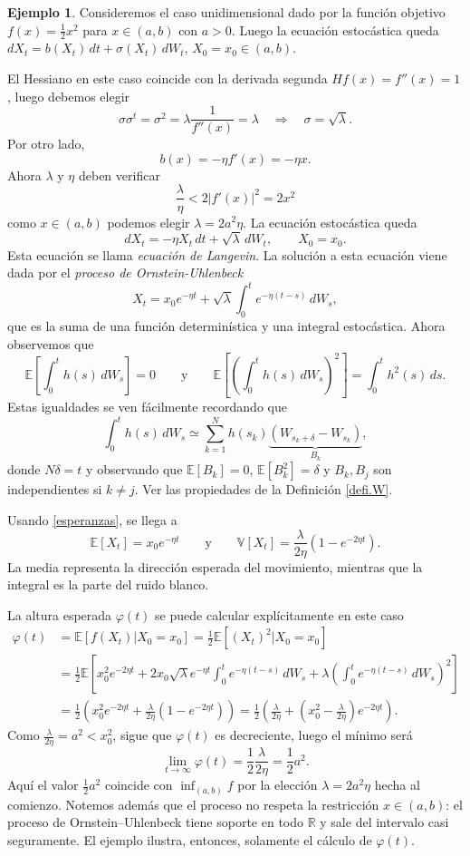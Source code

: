 \documentclass[12pt, a4paper]{amsbook}
\newcommand{\R}{{\mathbb R}}
\newcommand{\E}{{\mathbb E}}
\newcommand{\V}{{\mathbb V}}
\theoremstyle{remark}
\theoremstyle{definition}
\newtheorem{ejem}[teo]{Ejemplo}
\numberwithin{section}{chapter}
\numberwithin{subsection}{section}
\numberwithin{equation}{section}
\numberwithin{figure}{chapter}
\begin{document}
\begin{ejem}
Consideremos el caso unidimensional dado por la función objetivo $f(x)=\tfrac12 x^2$ para $x\in (a,b)$ con $a>0$. Luego la ecuación estocástica queda $dX_t = b(X_t)\, dt + \sigma(X_t)\, dW_t$, $X_0=x_0\in (a, b)$.

El Hessiano en este caso coincide con la derivada segunda $Hf(x) = f''(x) = 1$, luego debemos elegir 
$$
\sigma\sigma^t = \sigma^2 = \lambda \frac{1}{f''(x)} = \lambda\quad\Rightarrow\quad \sigma=\sqrt{\lambda}.
$$
Por otro lado,
$$
b(x) = -\eta f'(x) = -\eta x.
$$
Ahora $\lambda$ y $\eta$ deben verificar
$$
\frac{\lambda}{\eta} < 2|f'(x)|^2 = 2x^2
$$
como $x\in(a,b)$ podemos elegir $\lambda=2a^2\eta$. La ecuación estocástica queda
$$
dX_t = -\eta X_t\, dt + \sqrt{\lambda}\, dW_t,\qquad X_0=x_0.
$$
Esta ecuación se llama {\em ecuación de Langevin}. La solución a esta ecuación viene dada por el {\em proceso de Ornstein-Uhlenbeck}
$$
X_t = x_0 e^{-\eta t} + \sqrt{\lambda} \int_0^t e^{-\eta(t-s)}\, dW_s,
$$
que es la suma de una función determinística y una integral estocástica.
Ahora observemos que
\begin{equation}\label{esperanzas}
\E\left[\int_0^t h(s)\, dW_s\right] = 0\qquad \text{y}\qquad \E\left[\left(\int_0^t h(s)\, dW_s\right)^2\right] = \int_0^t h^2(s)\, ds.
\end{equation}
Estas igualdades se ven fácilmente recordando que
$$
\int_0^t h(s)\, dW_s \simeq \sum_{k=1}^N h(s_k) \underbrace{(W_{s_k+\delta} - W_{s_k})}_{B_k},
$$
donde $N\delta=t$ y observando que $\E[B_k]=0$, $\E[B_k^2]=\delta$ y $B_k, B_j$ son independientes si $k\neq j$. Ver las propiedades de la Definición \ref{defi.W}.

Usando \eqref{esperanzas}, se llega a
$$
\E[X_t] = x_0e^{-\eta t}\qquad \text{y} \qquad \V[X_t] = \frac{\lambda}{2\eta} (1-e^{-2\eta t}).
$$
La media representa la dirección esperada del movimiento, mientras que la integral es la parte del ruido blanco.

La altura esperada $\varphi(t)$ se puede calcular explícitamente en este caso
\begin{align*}
\varphi(t) & = \E[f(X_t)|X_0=x_0] = \frac12 \E[(X_t)^2|X_0=x_0]\\
&= \frac12 \E\left[ x_0^2 e^{-2\eta t} + 2x_0\sqrt{\lambda}e^{-\eta t}\int_0^t e^{-\eta(t-s)}\, dW_s + \lambda\left(\int_0^t e^{-\eta(t-s)}\, dW_s\right)^2\right]\\
&= \frac12 \left( x_0^2 e^{-2\eta t} +  \frac{\lambda}{2\eta} (1-e^{-2\eta t})\right) = \frac12 \left(\frac{\lambda}{2\eta} + \left(x_0^2 - \frac{\lambda}{2\eta}\right) e^{-2\eta t}\right).
\end{align*}
Como $\frac{\lambda}{2\eta}=a^2<x_0^2$, sigue que $\varphi(t)$ es decreciente, luego el mínimo será
$$
\lim_{t\to\infty} \varphi(t) = \frac12\frac{\lambda}{2\eta} = \frac12 a^2.
$$
Aquí el valor $\frac12a^2$ coincide con $\inf_{(a,b)}f$ por la elección $\lambda=2a^2\eta$ hecha al comienzo. Notemos además que el proceso no respeta la restricción $x\in(a,b)$: el proceso de Ornstein--Uhlenbeck tiene soporte en todo $\R$ y sale del intervalo casi seguramente. El ejemplo ilustra, entonces, solamente el cálculo de $\varphi(t)$.
\end{ejem}
\end{document}

